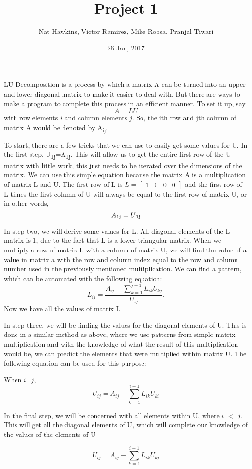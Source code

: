 \documentclass{article}
\title{Project 1}
\author{Nat Hawkins, Victor Ramirez, Mike Roosa, Pranjal Tiwari}
\date{26 Jan, 2017}
\begin{document}
\maketitle

LU-Decomposition is a process by which a matrix A can be turned into an upper and lower diagonal matrix to make it easier to deal with. But there are ways to make a program to complete this process in an efficient manner. To set it up, say 
\begin{equation*}
A = LU 
\end{equation*}
with row elements $i$ and column elements $j$. So, the ith row and jth column of matrix A would be denoted by A\textsubscript{ij}. 

To start, there are a few tricks that we can use to easily get some values for U. In the first step, U\textsubscript{1j}=A\textsubscript{1j}. This will allow us to get the entire first row of the U matrix with little work, this just needs to be iterated over the dimensions of the matrix. We can use this simple equation because the matrix A is a multiplication of matrix L and U. The first row of L is 
$L=\begin{bmatrix}
1&0&0&0
\end{bmatrix}$
and the first row of L times the first column of U will always be equal to the first row of matrix U, or in other words,
\begin{equation*}
A\textsubscript{1j}=U\textsubscript{1j}
\end{equation*}

In step two, we will derive some values for L. All diagonal elements of the L matrix is 1, due to the fact that L is a lower triangular matrix. When we multiply a row of matrix L with a column of matrix U, we will find the value of a value in matrix a with the row and column index equal to the row and column number used in the previously mentioned multiplication. We can find a pattern, which can be automated with the following equation:    
\begin{equation*}
L_{ij}=\frac{A_{ij} - \sum_{k=1}^{j-1} L_{ik} U_{kj}} {U_{ij}}.
\end{equation*}
Now we have all the values of matrix L

In step three, we will be finding the values for the diagonal elements of U. This is done in a similar method as above, where we use patterns from simple matrix multiplication and with the knowledge of what the result of this multiplication would be, we can predict the elements that were multiplied within matrix U. The following equation can be used for this purpose:

When $i$=$j$,
\begin{equation*}
U_{ij}=A_{ij} -\sum_{k=1}^{i-1} L_{ik} U_{ki}
\end{equation*}

In the final step, we will be concerned with all elements within U, where $i$ $<$ $j$. This will get all the diagonal elements of U, which will complete our knowledge of the values of the elements of U

\begin{equation*}
U_{ij} = A_{ij}- \sum_{k=1}^{i-1} L_{ik} U_{kj}
\end{equation*}
\end{document}
